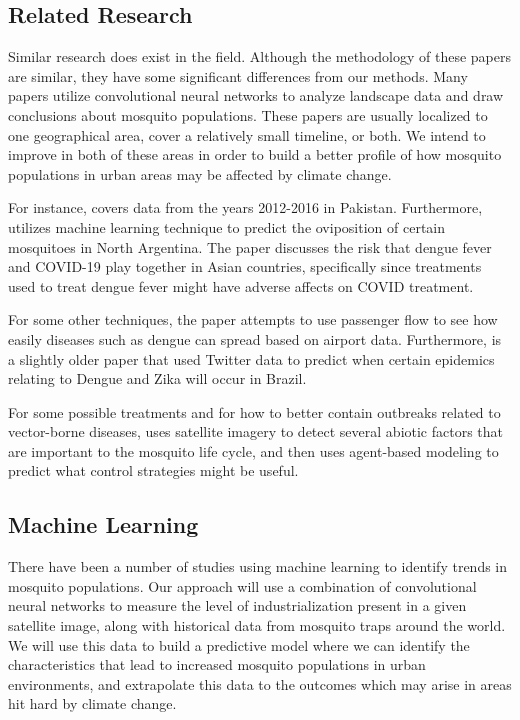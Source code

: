 \documentclass[11pt]{article}
\begin{document}
\subsection{Related Research}
Similar research does exist in the field. Although the methodology of these papers are similar, they have some significant differences from our methods. Many papers utilize convolutional neural networks to analyze landscape data and draw conclusions about mosquito populations. These papers are usually localized to one geographical area, cover a relatively small timeline, or both. We intend to improve in both of these areas in order to build a better profile of how mosquito populations in urban areas may be affected by climate change.

For instance, \parencite{deeplandscape} covers data from the years 2012-2016 in Pakistan. Furthermore, \parencite{ModelingDV} utilizes machine learning technique to predict the oviposition of certain mosquitoes in North Argentina.  The paper \parencite{doublepunch} discusses the risk that dengue fever and COVID-19 play together in Asian countries, specifically since treatments used to treat dengue fever might have adverse affects on COVID treatment. 

For some other techniques, the paper \parencite{dengue} attempts to use passenger flow to see how easily diseases such as dengue can spread based on airport data. Furthermore, \parencite{twitter} is a slightly older paper that used Twitter data to predict when certain epidemics relating to Dengue and Zika will occur in Brazil. 

For some possible treatments and for how to better contain outbreaks related to vector-borne diseases, \parencite{agent} uses satellite imagery to detect several abiotic factors that are important to the mosquito life cycle, and then uses agent-based modeling to predict what control strategies might be useful. 

\subsection{Machine Learning}
There have been a number of studies using machine learning to identify trends in mosquito populations. Our approach will use a combination of convolutional neural networks to measure the level of industrialization present in a given satellite image, along with historical data from mosquito traps around the world. We will use this data to build a predictive model where we can identify the characteristics that lead to increased mosquito populations in urban environments, and extrapolate this data to the outcomes which may arise in areas hit hard by climate change.
\end{document}
